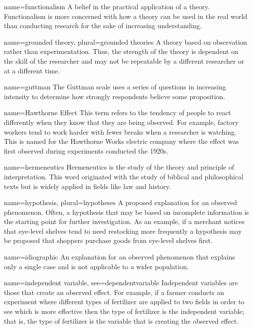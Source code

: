 {name={functionalism}}
{%
	A belief in the practical application of a theory. Functionalism is more concerned with how a theory can be used in the real world than conducting	research for the sake of increasing understanding. 
}

{name={grounded theory},
	plural={grounded theories}}
{%
	A theory based on observation rather than experimentation. Thus, the strength of the theory is dependent on the skill of the researcher and may not be repeatable by a different researcher or at a different time.
}

{name={guttman}}
{%
	The Guttman scale uses a series of questions in increasing intensity to determine how strongly respondents believe some proposition. 
}

{name={Hawthorne Effect}}
{%
	This term refers to the tendency of people to react differently when they know that they are being observed. For example, factory workers tend to work harder with fewer breaks when a researcher is watching. This is named for the Hawthorne Works electric company where the effect was first observed during experiments conducted the 1920s.
}

{name={hermeneutics}}
{%
	Hermeneutics is the study of the theory and principle of interpretation. This word originated with the study of biblical and philosophical texts but is widely applied in fields like law and history.
}

{name={hypothesis},
	plural={hypotheses}}
{%
	A proposed explanation for an observed phenomenon. Often, a hypothesis that may be based on incomplete information is the starting point for further investigation. As an example, if a merchant notices that eye-level shelves tend to need restocking more frequently a hypothesis may be proposed that shoppers purchase goods from eye-level shelves first. 
}

{name={idiographic}}
{%
	An explanation for an observed phenomenon that explains only a single case and is not applicable to a wider population.
}

{name={independent variable},
	see={dependentvariable}}
{%
	Independent variables are those that create an observed effect. For example, if a farmer conducts an experiment where different types of fertilizer are applied to two fields in order to see which is more effective then the type of fertilizer is the independent variable; that is, the type of fertilizer is the variable that is creating the observed effect.
}

